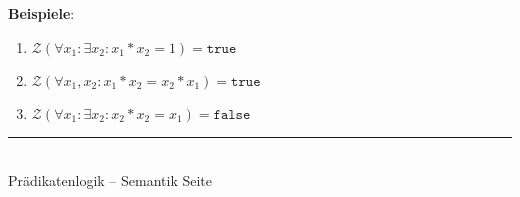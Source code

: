 \documentclass{slides}
\newcommand{\myrule}{\rule{20cm}{1mm}\\ }
\newcounter{mypage}
\begin{document}
\begin{slide}{}
\textbf{Beispiele}: 
\begin{enumerate}
\item $\mathcal{Z}( \forall x_1: \exists x_2: x_1 * x_2 = 1) = \mathtt{true}$
\item $\mathcal{Z}( \forall x_1, x_2: x_1 * x_2 = x_2 * x_1) = \mathtt{true}$
\item $\mathcal{Z}( \forall x_1: \exists x_2: x_2 * x_2 = x_1) = \mathtt{false}$
\end{enumerate}

\vspace*{\fill}
\tiny \addtocounter{mypage}{1}
\myrule
Prädikatenlogik -- Semantik  \hspace*{\fill} Seite 
\end{slide}

\end{document}
